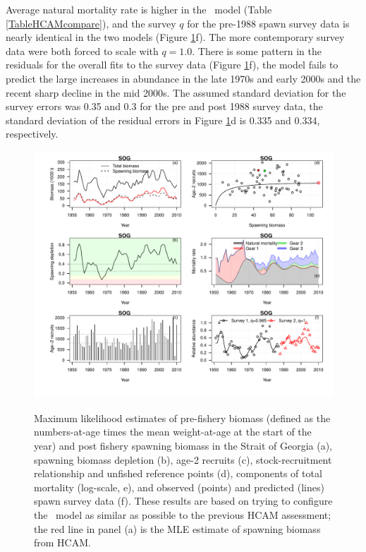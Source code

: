 
Average natural mortality rate is higher in the \iscam\ model (Table \ref{TableHCAMcompare}), and the survey $q$ for the pre-1988 spawn survey data is nearly identical in the two models (Figure \ref{fig1_HCAM_ctrl}f).  The more contemporary survey data were both forced to scale with $q=1.0$.  There is some pattern in the residuals for the overall fits to the survey data (Figure \ref{fig1_HCAM_ctrl}f), the model fails to predict the large increases in abundance in the late 1970s and early 2000s and the recent sharp decline in the mid 2000s.  The assumed standard deviation for the survey errors was 0.35 and 0.3 for the pre and post 1988 survey data, the standard deviation of the residual errors in Figure \ref{fig1_HCAM_ctrl}d is 0.335 and 0.334, respectively.
	
\begin{figure}[!tbp]
	\includegraphics[width=\textwidth]{../Figs/iscam_fig_HCAM_SOG_MLE.pdf}\\
	\caption{Maximum likelihood estimates of pre-fishery biomass (defined as the numbers-at-age times the mean weight-at-age at the start of the year) and post fishery spawning biomass in the Strait of Georgia (a), spawning biomass depletion (b), age-2 recruits (c), stock-recruitment relationship and unfished reference points (d), components of total mortality (log-scale, e), and observed (points) and predicted (lines) spawn survey data (f).  These results are based on trying to configure the \iscam\ model as similar as possible to the previous HCAM assessment; the red line in panel (a) is the MLE estimate of spawning biomass from HCAM.}\label{fig1_HCAM_ctrl}
\end{figure}


